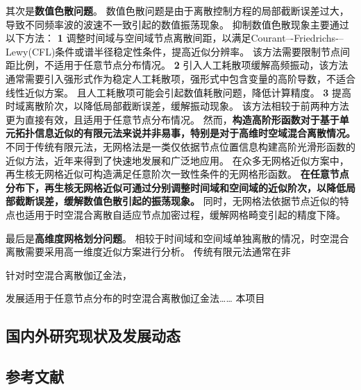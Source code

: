 其次是\textbf{数值色散问题}。
数值色散问题是由于离散控制方程的局部截断误差过大，导致不同频率波的波速不一致引起的数值振荡现象。
抑制数值色散现象主要通过以下方法：
\textcircled{\textbf{\small 1}}
调整时间域与空间域节点离散间距，以满足Courant–-Friedrichs-–Lewy(CFL)条件或谱半径稳定性条件，提高近似分辨率。
该方法需要限制节点间距比例，不适用于任意节点分布情况。
\textcircled{\textbf{\small 2}}
引入人工耗散项缓解高频振动，该方法通常需要引入强形式作为稳定人工耗散项，强形式中包含变量的高阶导数，不适合线性近似方案。
且人工耗散项可能会引起数值耗散问题，降低计算精度。
\textcircled{\textbf{\small 3}}
提高时域离散阶次，以降低局部截断误差，缓解振动现象。
该方法相较于前两种方法更为直接有效，且适用于任意节点分布情况。
然而，\textbf{构造高阶形函数对于基于单元拓扑信息近似的有限元法来说并非易事，特别是对于高维时空域混合离散情况。}
不同于传统有限元法，无网格法\cite{Zhang2004a}是一类仅依据节点位置信息构建高阶光滑形函数的近似方法，近年来得到了快速地发展和广泛地应用。
在众多无网格近似方案中，再生核无网格近似可构造满足任意阶次一致性条件的无网格形函数。
\textbf{在任意节点分布下，再生核无网格近似可通过分别调整时间域和空间域的近似阶次，以降低局部截断误差，缓解数值色散引起的振荡现象。}
同时，无网格法依据节点近似的特点也适用于时空混合离散自适应节点加密过程，缓解网格畸变引起的精度下降。

最后是\textbf{高维度网格划分问题}。
相较于时间域和空间域单独离散的情况，时空混合离散需要采用高一维度近似方案进行分析。
传统有限元法通常在非


针对时空混合离散伽辽金法，

发展适用于任意节点分布的时空混合离散伽辽金法……
本项目

\subsection{国内外研究现状及发展动态}

\vspace{-5pt}

\begin{REF}
	\subsection*{参考文献}
	\vspace{-50pt}
	
\end{REF}

\newpage%
